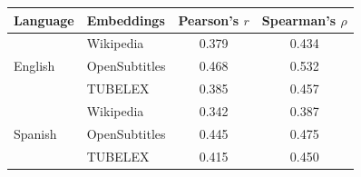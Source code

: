 \begin{tabular}{llcc}
\toprule
Language & Embeddings & Pearson's $r$ & Spearman's $\rho$ \\
\midrule
\multirow[c]{3}{*}{English} & Wikipedia & 0.379 & 0.434 \\
 & OpenSubtitles & 0.468 & 0.532 \\
 & TUBELEX & 0.385 & 0.457 \\
\hline
\multirow[c]{3}{*}{Spanish} & Wikipedia & 0.342 & 0.387 \\
 & OpenSubtitles & 0.445 & 0.475 \\
 & TUBELEX & 0.415 & 0.450 \\
\bottomrule
\end{tabular}
